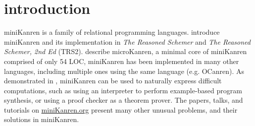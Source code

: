 \documentclass[acmlarge, review=true]{acmart}
\begin{document}
\maketitle

\section{introduction}

miniKanren is a family of relational programming languages.
\citet{Friedman:2005:RS:1121583,friedman_reasoned_2018} introduce
miniKanren and its implementation in \emph{The Reasoned Schemer} 
and \emph{The Reasoned Schemer, 2nd Ed} (TRS2). \mbox{\citet{Hemann_2016}}
describe microKanren, a minimal core of miniKanren comprised of only 54 LOC, 
miniKanren has been implemented in many other languages, including
multiple ones using the same language (e.g. OCanren\citep{kosarev2018typed}). 
As demonstrated in \citet{byrd2017unified}, miniKanren can be used to
naturally express difficult computations, such as using an interpreter
to perform example-based program synthesis, or using a proof checker
as a theorem prover.
The papers, talks, and tutorials on \url{miniKanren.org} present many
other unusual problems, and their solutions in miniKanren.

\end{document}
